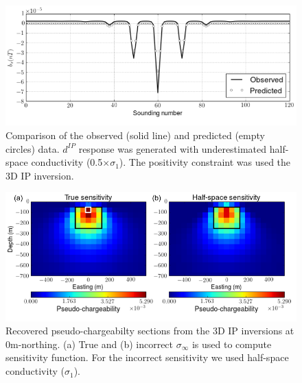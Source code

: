 \documentclass[a4paper, 11pt]{article}
\newcommand{\siginf}{\sigma_\infty}
\newcommand{\dip}{d^{IP}}
\begin{document}
\begin{figure}[htb]
  \centering
  \includegraphics[width=1.\textwidth]{figures/Reg_obspred.png}
  \caption{Comparison of the observed (solid line) and predicted (empty circles) data. $\dip$ response was generated with underestimated half-space conductivity (0.5$\times \sigma_1$). The positivity constraint was used the 3D IP inversion.}
  \label{F:Reg_obspred}
\end{figure}

\begin{figure}[htb]
  \centering
  \includegraphics[width=1.\textwidth]{figures/True_vs_approx_sensitivity.png}
  \caption{Recovered pseudo-chargeabilty sections from the 3D IP inversions at 0m-northing.  (a) True and (b) incorrect $\siginf$ is used to compute sensitivity function. For the incorrect sensitivity we used half-space conductivity ($\sigma_1$).}
  \label{F:True_vs_approx_sensitivity}
\end{figure}
\clearpage

\end{document}
